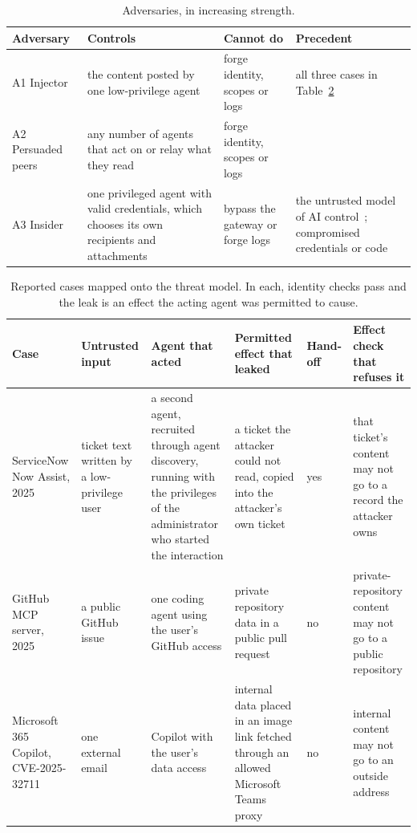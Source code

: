 \documentclass[conference,compsoc]{IEEEtran}
\begin{document}
\begin{table}[!t]
\centering
\caption{Adversaries, in increasing strength.}
\label{tab:3}
\footnotesize
\begin{tabularx}{\textwidth}{@{}>{\raggedright\arraybackslash}p{}>{\hsize=1.3\hsize\raggedright\arraybackslash}X>{\hsize=0.7\hsize\raggedright\arraybackslash}X>{\hsize=1\hsize\raggedright\arraybackslash}X@{}}
\toprule
\textbf{Adversary} & \textbf{Controls} & \textbf{Cannot do} & \textbf{Precedent} \\
\midrule
A1 Injector & the content posted by one low-privilege agent & forge identity, scopes or logs & all three cases in Table~\ref{tab:4} \\
A2 Persuaded peers & any number of agents that act on or relay what they read & forge identity, scopes or logs & \cite{lee2024promptinfection,cohen2024aiworm,triedman2025} \\
A3 Insider & one privileged agent with valid credentials, which chooses its own recipients and attachments & bypass the gateway or forge logs & the untrusted model of AI control~\cite{greenblatt2024}; compromised credentials or code \\
\bottomrule
\end{tabularx}
\end{table}

\begin{table}[!t]
\centering
\caption{Reported cases mapped onto the threat model. In each, identity checks pass and the leak is an effect the acting agent was permitted to cause.}
\label{tab:4}
\footnotesize
\begin{tabularx}{\textwidth}{@{}>{\raggedright\arraybackslash}p{}>{\raggedright\arraybackslash}p{}>{\hsize=1.2\hsize\raggedright\arraybackslash}X>{\hsize=0.9\hsize\raggedright\arraybackslash}X>{\centering\arraybackslash}p{}>{\hsize=0.9\hsize\raggedright\arraybackslash}X@{}}
\toprule
\textbf{Case} & \textbf{Untrusted input} & \textbf{Agent that acted} & \textbf{Permitted effect that leaked} & \textbf{Hand-off} & \textbf{Effect check that refuses it} \\
\midrule
ServiceNow Now Assist, 2025~\cite{costello2025appomni} & ticket text written by a low-privilege user & a second agent, recruited through agent discovery, running with the privileges of the administrator who started the interaction & a ticket the attacker could not read, copied into the attacker's own ticket & yes & that ticket's content may not go to a record the attacker owns \\
GitHub MCP server, 2025~\cite{invariant2025github} & a public GitHub issue & one coding agent using the user's GitHub access & private repository data in a public pull request & no & private-repository content may not go to a public repository \\
Microsoft 365 Copilot, CVE-2025-32711~\cite{reddy2025echoleak} & one external email & Copilot with the user's data access & internal data placed in an image link fetched through an allowed Microsoft Teams proxy & no & internal content may not go to an outside address \\
\bottomrule
\end{tabularx}
\end{table}
\end{document}
